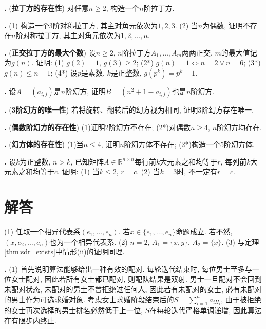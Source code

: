 \par \textbf{\theprobdes .} (\textbf{拉丁方的存在性}) 对任意$n\ge 2$, 构造一个$n$阶拉丁方. 


\par \textbf{\theprobdes .} \cite{IC} (1) 构造一个3阶对称拉丁方, 其主对角元依次为$1,2,3$. (2) 当$n$为偶数, 证明不存在$n$阶对称拉丁方, 其主对角元依次为$1,2,\dots, n$.

\par \textbf{\theprobdes .} (\textbf{正交拉丁方的最大个数}) 设$n\ge 2$, $n$阶拉丁方$A_1,\dots, A_m$两两正交, $m$的最大值记为$g(n)$. 证明: (1) $g(2)=1$, $g(3)\ge 2$; (2*) $g(n)=1 \iff n=2 \lor n=6$; (3*) $g(n)\le n-1$; (4*) 设$p$是素数, $k$是正整数, $g(p^k)=p^k-1$.

\par \textbf{\theprobdes .} \cite{IC} 设$A=(a_{i,j})$是$n$阶幻方, 证明$B=(n^2+1-a_{i,j})$也是$n$阶幻方. 

\par \textbf{\theprobdes .} (\textbf{3阶幻方的唯一性}) 若将旋转、翻转后的幻方视为相同, 证明3阶幻方存在唯一. 

\par \textbf{\theprobdes .} (\textbf{偶数阶幻方的存在性}) (1)证明2阶幻方不存在; (2*)对偶数$n\ge 4$, $n$阶幻方均存在. 

\par \textbf{\theprobdes .} (\textbf{幻方体的存在性}) (1)当$n\le 4$, 证明$n$阶幻方体不存在; (2*)构造一个5阶幻方体. 

\par \textbf{\theprobdes .} \cite{MaP} 设$k$为正整数, $n>k$, 已知矩阵$A\in \mathbb{R}^{n\times n}$每行前$k$大元素之和均等于$r$, 每列前$k$大元素之和均等于$c$. 证明: (1) 当$k\le 2$, $r=c$. (2) 当$k=3$时, 不一定有$r=c$. 


\section*{解答}


 (1) 任取一个相异代表系$(e_1,\dots,e_n)$. 若$x\in \{e_1,\dots,e_n\}$命题成立. 若不然, $(x,e_2,\dots,e_n)$也为一个相异代表系. (2) $n=2$, $A_1=\{x, y\}$, $A_2=\{x\}$. (3) 与定理\ref{thm:sdr_exists}中情形(ii)的证明同理. 

\par \textbf{\thesoldes .} (1) 首先说明算法能够给出一种有效的配对. 每轮迭代结束时, 每位男士至多与一位女士配对, 因此若所有女士都已配对, 则配队结果是双射. 男士一旦配对不会回到未配对状态, 未配对的男士不曾拒绝过任何人, 因此若有未配对的女士, 必有未配对的男士作为可选求婚对象. 考虑女士求婚阶段结束后的$S=\sum_{i=1}^n a_{iH_i}$, 由于被拒绝的女士再次选择的男士排名必然低于上一位, $S$在每轮迭代严格单调递增, 因此算法在有限步内终止. 

